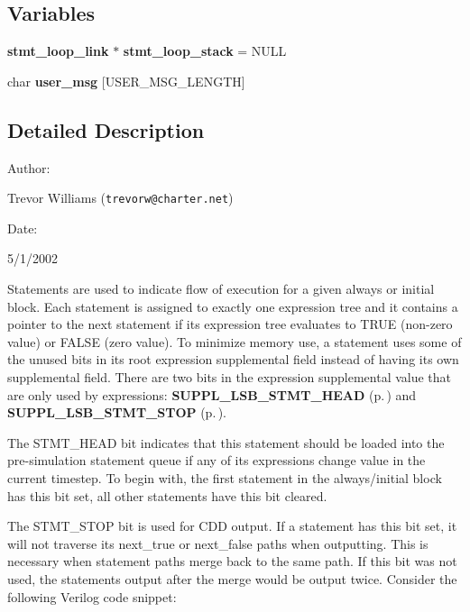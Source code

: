 \subsection*{Variables}
\begin{CompactItemize}
\item 
{\bf stmt\_\-loop\_\-link} $\ast$ {\bf stmt\_\-loop\_\-stack} = NULL
\item 
char {\bf user\_\-msg} [USER\_\-MSG\_\-LENGTH]
\end{CompactItemize}


\subsection{Detailed Description}


\begin{Desc}
\item[Author: ]\par
Trevor Williams ({\tt trevorw@charter.net}) \end{Desc}
\begin{Desc}
\item[Date: ]\par
5/1/2002

 Statements are used to indicate flow of execution for a given always or initial block. Each statement is assigned to exactly one expression tree and it contains a pointer to the next statement if its expression tree evaluates to TRUE (non-zero value) or FALSE (zero value). To minimize memory use, a statement  uses some of the unused bits in its root expression supplemental field instead of having its own supplemental field. There are two bits in the expression supplemental value that are only used by expressions: {\bf SUPPL\_\-LSB\_\-STMT\_\-HEAD} {\rm (p.\,\pageref{group__expr__suppl_a3})} and {\bf SUPPL\_\-LSB\_\-STMT\_\-STOP} {\rm (p.\,\pageref{group__expr__suppl_a4})}.

 The STMT\_\-HEAD bit indicates that this statement should be loaded into the pre-simulation statement queue if any of its expressions change value in the current timestep. To begin with, the first statement in the always/initial block has this bit set, all other statements have this bit cleared.

 The STMT\_\-STOP bit is used for CDD output. If a statement has this bit set, it will not traverse its next\_\-true or next\_\-false paths when outputting. This is necessary when statement paths merge back to the same path. If this bit was not used, the statements output after the merge would be output twice. Consider the following Verilog code snippet:\end{Desc}


